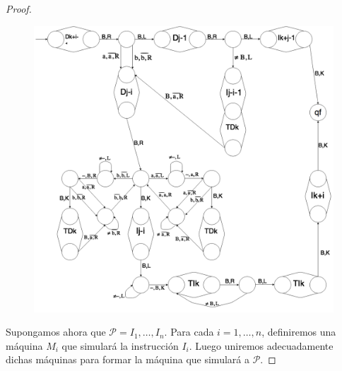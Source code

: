 \begin{proof}
    \begin{figure}[h]
      \centering
      \includegraphics[scale=0.33]{graphics/figure_7.png}
    \end{figure}

    \pagebreak
    \PN Supongamos ahora que $\mathcal{P} = I_{1}, \dotsc, I_{n}$. Para cada $i = 1, \dotsc, n$, definiremos una máquina
    $M_{i}$ que simulará la instrucción $I_{i}$. Luego uniremos adecuadamente dichas máquinas para formar la máquina que
    simulará a $\mathcal{P}$.


\end{proof}
